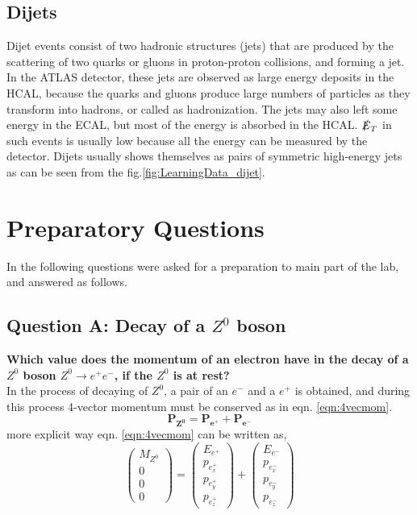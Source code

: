 \subsection{Dijets}
\label{subsec:jets_disp}
Dijet events consist of two hadronic structures (jets) that are produced by the scattering of two quarks or gluons in proton-proton collisions, and forming a jet. In the ATLAS detector, these jets are observed as large energy deposits in the HCAL, because the quarks and gluons produce large numbers of particles as they transform into hadrons, or called as hadronization. The jets may also left some energy in the ECAL, but most of the energy is absorbed in the HCAL. $\slashed{E}_T$ in such events is usually low because all the energy can be measured by the detector. Dijets usually shows themselves as pairs of symmetric high-energy jets as can be seen from the fig.\ref{fig:LearningData_dijet}.


\section{Preparatory Questions}
\label{sec:prepquest}
In the following questions were asked for a preparation to main part of the lab, and answered as follows. 


\subsection{Question A: Decay of a $Z^0$ boson}
\label{sec:QuestionA}
\textbf{Which value does the momentum of an electron have in the decay of a $Z^0$ boson  $Z^0\rightarrow e^+e^-$, if the $Z^0$ is at rest?} \cite{atlaslabmanual}\\
In the process of decaying of $Z^0$, a pair of an $e^-$ and a $e^+$ is obtained, and during this process 
4-vector momentum must be conserved as in eqn. \ref{eqn:4vecmom}.
\begin{equation}
	\label{eqn:4vecmom}
	\mathbf{P_{Z^0}} = \mathbf{P_{e^+}} + \mathbf{P_{e^-}}
\end{equation}
more explicit way eqn. \ref{eqn:4vecmom} can be written as,
\begin{equation}
	\label{eqn:4vecmom_exp}
	\begin{pmatrix} M_{Z^0} \\ 0 \\ 0 \\ 0  \end{pmatrix}=
	\begin{pmatrix} E_{e^+} \\ p_{e^+_x}\\p_{e^+_y}\\p_{e^+_z} \end{pmatrix} +
	\begin{pmatrix} E_{e^-} \\ p_{e^-_x}\\p_{e^-_y}\\p_{e^-_z} \end{pmatrix} 
\end{equation}



